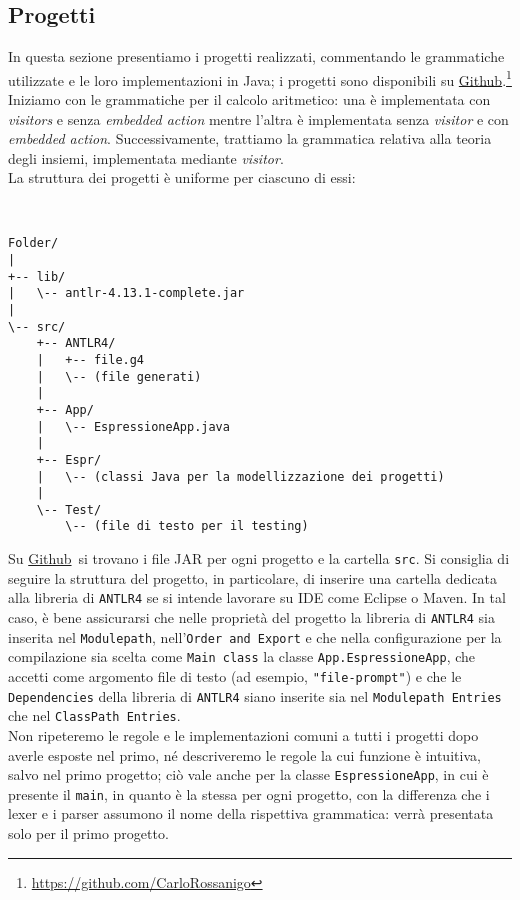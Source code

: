 \documentclass{article}
\newcommand{\Link}{\href{https://github.com/CarloRossanigo}{Github}}
\begin{document}
    
\subsection{Progetti}

In questa sezione presentiamo i progetti realizzati, commentando le grammatiche utilizzate e le loro implementazioni in Java; i progetti sono disponibili su \Link.\footnote{\url{https://github.com/CarloRossanigo}}
\noindent
Iniziamo con le grammatiche per il calcolo aritmetico: una è implementata con \textit{visitors} e senza \textit{embedded action} mentre l'altra è implementata senza \textit{visitor} e con \textit{embedded action}. Successivamente, trattiamo la grammatica relativa alla teoria degli insiemi, implementata mediante \textit{visitor}. 
\\\noindent
La struttura dei progetti è uniforme per ciascuno di essi: \begin{verbatim}


Folder/
|
+-- lib/
|   \-- antlr-4.13.1-complete.jar
|
\-- src/
    +-- ANTLR4/
    |   +-- file.g4
    |   \-- (file generati)
    |
    +-- App/
    |   \-- EspressioneApp.java
    |
    +-- Espr/
    |   \-- (classi Java per la modellizzazione dei progetti) 
    |
    \-- Test/
        \-- (file di testo per il testing)
\end{verbatim}

\noindent
Su \Link ~si trovano i file JAR per ogni progetto e la cartella \texttt{src}. Si consiglia di seguire la struttura del progetto, in particolare, di inserire una cartella dedicata alla libreria di \texttt{ANTLR4} se si intende lavorare su IDE come Eclipse o Maven. In tal caso, è bene assicurarsi che nelle proprietà del progetto la libreria di \texttt{ANTLR4} sia inserita nel \texttt{Modulepath}, nell'\texttt{Order and Export} e che nella configurazione per la compilazione sia scelta come \texttt{Main class} la classe \texttt{App.EspressioneApp}, che accetti come argomento file di testo (ad esempio, \texttt{"file-prompt"}) e che le \texttt{Dependencies} della libreria di \texttt{ANTLR4} siano inserite sia nel \texttt{Modulepath Entries} che nel \texttt{ClassPath Entries}.
\\\noindent
Non ripeteremo le regole e le implementazioni comuni a tutti i progetti dopo averle esposte nel primo, né descriveremo le regole la cui funzione è intuitiva, salvo nel primo progetto; ciò vale anche per la classe \texttt{EspressioneApp}, in cui è presente il \texttt{main}, in quanto è la stessa per ogni progetto, con la differenza che i lexer e i parser assumono il nome della rispettiva grammatica: verrà presentata solo per il primo progetto.
\end{document}

